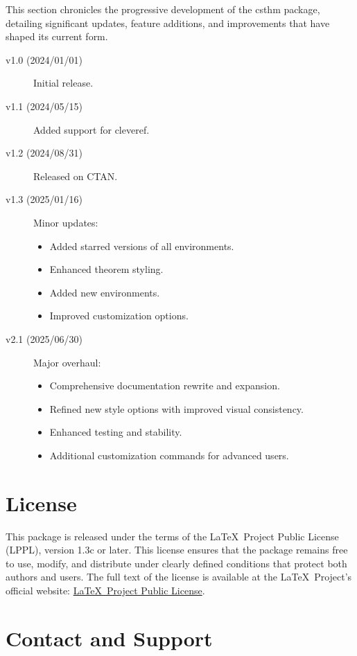 \documentclass[10pt,letterpaper]{amsart}
\begin{document}
This section chronicles the progressive development of the \textsf{csthm}
package, detailing significant updates, feature additions, and improvements
that have shaped its current form.

\begin{description}
	\item[v1.0 (2024/01/01)] Initial release.
	\item[v1.1 (2024/05/15)] Added support for \textsf{cleveref}.
	\item[v1.2 (2024/08/31)] Released on CTAN.
	\item[v1.3 (2025/01/16)] Minor updates:
	      \begin{itemize}
		      \item Added starred versions of all environments.
		      \item Enhanced theorem styling.
		      \item Added new environments.
		      \item Improved customization options.
	      \end{itemize}
	\item[v2.1 (2025/06/30)] Major overhaul:
	      \begin{itemize}
		      \item Comprehensive documentation rewrite and expansion.
		      \item Refined new style options with improved visual consistency.
		      \item Enhanced testing and stability.
		      \item Additional customization commands for advanced users.
	      \end{itemize}
\end{description}

\section{License}

This package is released under the terms of the \LaTeX\ Project Public License
(LPPL), version 1.3c or later. This license ensures that the package remains
free to use, modify, and distribute under clearly defined conditions that
protect both authors and users. The full text of the license is available at
the \LaTeX\ Project's official website:
\href{http://www.latex-project.org/lppl.txt}{\LaTeX\ Project Public License}.

\section{Contact and Support}
\end{document}
